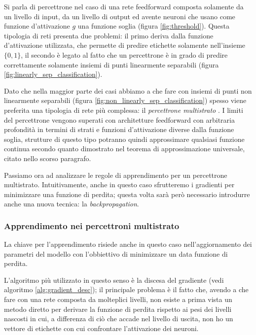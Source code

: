 \documentclass[../../main.tex]{subfiles}
\begin{document}
Si parla di percettrone nel caso di una rete feedforward composta solamente da un livello di input, da un livello di output ed avente neuroni che usano come funzione d'attivazione $g$ una funzione soglia (figura \ref{fig:threshold}). Questa tipologia di reti presenta due problemi: il primo deriva dalla funzione d'attivazione utilizzata, che permette di predire etichette solamente nell'insieme $\{0,1\}$, il secondo è legato al fatto che un percettrone è in grado di predire correttamente solamente insiemi di punti linearmente separabili (figura \ref{fig:linearly_sep_classification}).

Dato che nella maggior parte dei casi abbiamo a che fare con insiemi di punti non linearmente separabili (figura \ref{fig:non_linearly_sep_classification}) spesso viene preferita una tipologia di rete più complessa: il \textit{percettrone multistrato} \cite{mcculloch43a}. I limiti del percettrone vengono superati con architetture feedforward con arbitraria profondità in termini di strati e funzioni d'attivazione diverse dalla funzione soglia, strutture di questo tipo potranno quindi approssimare qualsiasi funzione continua secondo quanto dimostrato nel teorema di approssimazione universale, citato nello scorso paragrafo.

Passiamo ora ad analizzare le regole di apprendimento per un percettrone multistrato. Intuitivamente, anche in questo caso sfrutteremo i gradienti per minimizzare una funzione di perdita; questa volta sarà però necessario introdurre anche una nuova tecnica: la \textit{backpropagation}.

\subsubsection{Apprendimento nei percettroni multistrato}
La chiave per l'apprendimento risiede anche in questo caso nell'aggiornamento dei parametri del modello con l'obbiettivo di minimizzare un data funzione di perdita.

L'algoritmo più utilizzato in questo senso è la discesa del gradiente (vedi algoritmo \ref{alg:gradient_desc}); il principale problema è il fatto che, avendo a che fare con una rete composta da molteplici livelli, non esiste a prima vista un metodo diretto per derivare la funzione di perdita rispetto ai pesi dei livelli nascosti in cui, a differenza di ciò che accade nel livello di uscita, non ho un vettore di etichette con cui confrontare l'attivazione dei neuroni.
\end{document}
